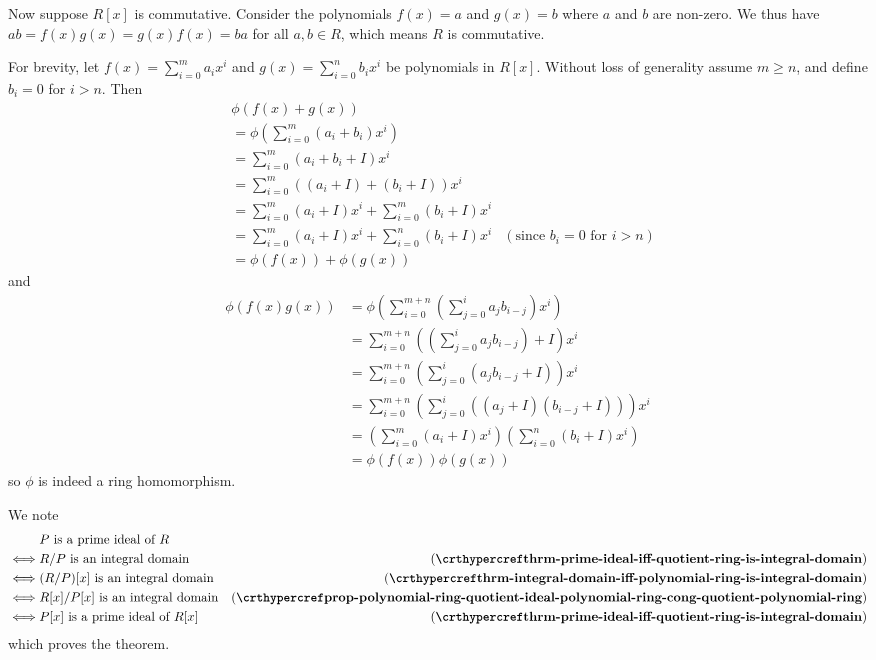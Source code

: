 \begin{questions}
\begin{partquestions}{\alph*}
        Now suppose $R[x]$ is commutative. Consider the polynomials $f(x) = a$ and $g(x) = b$ where $a$ and $b$ are non-zero. We thus have $ab = f(x)g(x) = g(x)f(x) = ba$ for all $a,b \in R$, which means $R$ is commutative.
    \end{partquestions}

    \item For brevity, let $\displaystyle f(x) = \sum_{i=0}^ma_ix^i$ and $\displaystyle g(x) = \sum_{i=0}^nb_ix^i$ be polynomials in $R[x]$. Without loss of generality assume $m \geq n$, and define $b_i = 0$ for $i > n$. Then
    \begin{align*}
        &\phi(f(x) + g(x))\\
        &= \phi\left(\sum_{i=0}^m (a_i+b_i)x^i\right)\\
        &= \sum_{i=0}^m (a_i+b_i + I)x^i\\
        &= \sum_{i=0}^m ((a_i + I) + (b_i + I))x^i\\
        &= \sum_{i=0}^m (a_i + I)x^i + \sum_{i=0}^m (b_i + I)x^i\\
        &= \sum_{i=0}^m (a_i + I)x^i + \sum_{i=0}^n (b_i + I)x^i & (\text{since } b_i = 0\text{ for } i > n)\\
        &= \phi(f(x)) + \phi(g(x))
    \end{align*}
    and
    \begin{align*}
        \phi(f(x)g(x)) &= \phi\left(\sum_{i=0}^{m+n}\left(\sum_{j=0}^i a_jb_{i-j}\right)x^i\right)\\
        &= \sum_{i=0}^{m+n}\left(\left(\sum_{j=0}^i a_jb_{i-j}\right) + I\right)x^i\\
        &= \sum_{i=0}^{m+n}\left(\sum_{j=0}^i (a_jb_{i-j} + I)\right)x^i\\
        &= \sum_{i=0}^{m+n}\left(\sum_{j=0}^i ((a_j+I)(b_{i-j}+I))\right)x^i\\
        &= \left(\sum_{i=0}^m(a_i+I)x^i\right)\left(\sum_{i=0}^n(b_i+I)x^i\right)\\
        &= \phi(f(x))\phi(g(x))
    \end{align*}
    so $\phi$ is indeed a ring homomorphism.

    \item We note
    \begin{align*}
        &P \text{ is a prime ideal of }R\\
        \iff&R/P \text{ is an integral domain} & (\myref{thrm-prime-ideal-iff-quotient-ring-is-integral-domain})\\
        \iff&(R/P)[x] \text{ is an integral domain} & (\myref{thrm-integral-domain-iff-polynomial-ring-is-integral-domain})\\
        \iff&R[x]/P[x] \text{ is an integral domain} & (\myref{prop-polynomial-ring-quotient-ideal-polynomial-ring-cong-quotient-polynomial-ring})\\
        \iff&P[x]\text{ is a prime ideal of }R[x] & (\myref{thrm-prime-ideal-iff-quotient-ring-is-integral-domain})
    \end{align*}
    which proves the theorem.


\end{questions}
